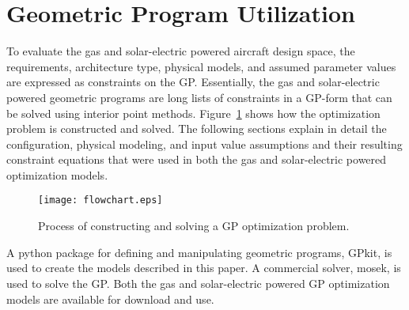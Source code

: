 \section{Geometric Program Utilization}

To evaluate the gas and solar-electric powered aircraft design space, the requirements, architecture type, physical models, and assumed parameter values are expressed as constraints on the GP.\cite{hoburgthesis} 
Essentially, the gas and solar-electric powered geometric programs are long lists of constraints in a GP-form that can be solved using interior point methods.  
Figure~\ref{f:flowchart} shows how the optimization problem is constructed and solved. 
The following sections explain in detail the configuration, physical modeling, and input value assumptions and their resulting constraint equations that were used in both the gas and solar-electric powered optimization models.

\begin{figure}[h!]
	\begin{center}
	\texttt{[image: flowchart.eps]}
    \caption{Process of constructing and solving a GP optimization problem.}
	\label{f:flowchart}
	\end{center}
\end{figure}

A python package for defining and manipulating geometric programs, GPkit\cite{gpkitdocs}, is used to create the models described in this paper.  
A commercial solver, mosek,\cite{mosek} is used to solve the GP. 
Both the gas and solar-electric powered GP optimization models are available for download and use.\cite{gassolartrade} 

